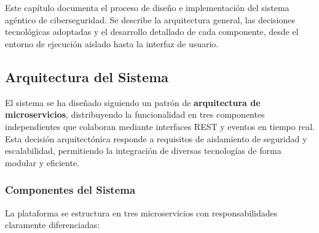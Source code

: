 \chapter{\implementationdevelopmentname}

Este capítulo documenta el proceso de diseño e implementación del sistema agéntico de ciberseguridad. Se describe la arquitectura general, las decisiones tecnológicas adoptadas y el desarrollo detallado de cada componente, desde el entorno de ejecución aislado hasta la interfaz de usuario.


\section{Arquitectura del Sistema}
\label{sec:arquitectura_sistema}

El sistema se ha diseñado siguiendo un patrón de \textbf{arquitectura de microservicios}, distribuyendo la funcionalidad en tres componentes independientes que colaboran mediante interfaces REST y eventos en tiempo real. Esta decisión arquitectónica responde a requisitos de aislamiento de seguridad y escalabilidad, permitiendo la integración de diversas tecnologías de forma modular y eficiente.

\subsection{Componentes del Sistema}

La plataforma se estructura en tres microservicios con responsabilidades claramente diferenciadas:

